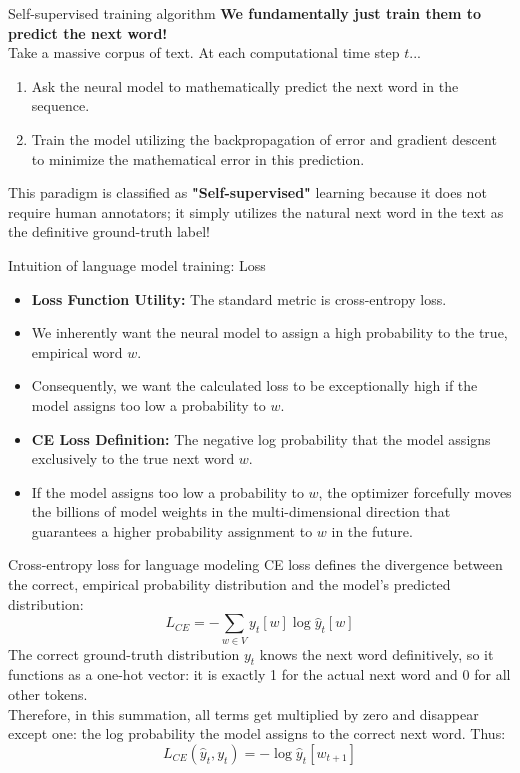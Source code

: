 \documentclass[aspectratio=169]{beamer}
\begin{document}
\begin{frame}{Self-supervised training algorithm}\justifying
    \textbf{We fundamentally just train them to predict the next word!} \\
    Take a massive corpus of text. At each computational time step $t$...
    \begin{enumerate}
        \item Ask the neural model to mathematically predict the next word in the sequence.
        \item Train the model utilizing the backpropagation of error and gradient descent to minimize the mathematical error in this prediction.
    \end{enumerate}
    \vspace{0.5cm}
    This paradigm is classified as \textbf{"Self-supervised"} learning because it does not require human annotators; it simply utilizes the natural next word in the text as the definitive ground-truth label!
\end{frame}

\begin{frame}{Intuition of language model training: Loss}\justifying
    \begin{itemize}
        \item \textbf{Loss Function Utility:} The standard metric is cross-entropy loss.
        \item We inherently want the neural model to assign a high probability to the true, empirical word $w$.
        \item Consequently, we want the calculated loss to be exceptionally high if the model assigns too low a probability to $w$.
        \item \textbf{CE Loss Definition:} The negative log probability that the model assigns exclusively to the true next word $w$.
        \item If the model assigns too low a probability to $w$, the optimizer forcefully moves the billions of model weights in the multi-dimensional direction that guarantees a higher probability assignment to $w$ in the future.
    \end{itemize}
\end{frame}

\begin{frame}{Cross-entropy loss for language modeling}\justifying
    CE loss defines the divergence between the correct, empirical probability distribution and the model's predicted distribution:
    \[ L_{CE} = -\sum_{w \in V} y_t[w] \log \hat{y}_t[w] \]
    The correct ground-truth distribution $y_t$ knows the next word definitively, so it functions as a one-hot vector: it is exactly 1 for the actual next word and 0 for all other tokens. \\
    \vspace{0.5cm}
    Therefore, in this summation, all terms get multiplied by zero and disappear except one: the log probability the model assigns to the correct next word. Thus:
    \[ L_{CE}(\hat{y}_t, y_t) = -\log \hat{y}_t[w_{t+1}] \]
\end{frame}
\end{document}
